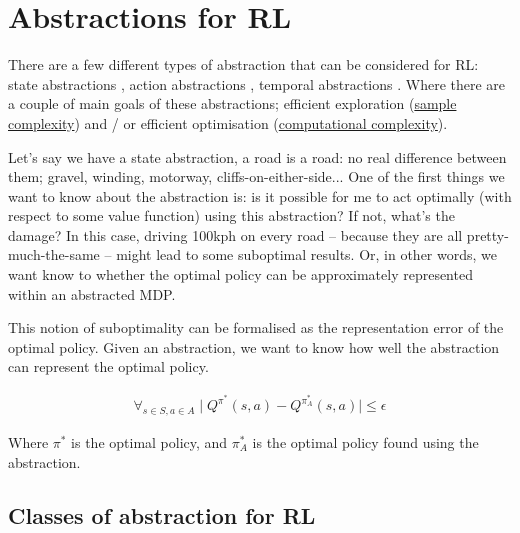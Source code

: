 \section{Abstractions for RL}

There are a few different types of abstraction that can be considered for RL:
state abstractions \cite{Littman2006,Haarnoja,Cuccu2018,Zhonga,Vezzani2019,Abel2018,Duan2018,Abel2017,Silver2016a},
action abstractions \cite{Chandak2019,Bester2019,Tennenholtz2019}, temporal abstractions \cite{Rafati,Mankowitz2018,Harutyunyan2017,Fruit2017,Riemer2018,Bacon2018,Achiam2018,Pham2019,Konidaris2018,Haarnoja,Sutton1999,Fruit2017a,Bacon2016a,Jinnai2018,Nachum2018}.
Where there are a couple of main goals of these abstractions; efficient exploration
(\href{https://en.wikipedia.org/wiki/Sample_complexity}{sample complexity})
and / or efficient optimisation (\href{https://en.wikipedia.org/wiki/Computational_complexity_theory}{computational complexity}).

Let's say we have a state abstraction, a road is a road: no real difference
between them; gravel, winding, motorway, cliffs-on-either-side...
One of the first things we want to know about the abstraction is:
is it possible for me to act optimally (with respect to some value function)
using this abstraction? If not, what's the damage? In this case, driving 100kph on every road --
because they are all pretty-much-the-same -- might lead to some suboptimal results.
Or, in other words, we want know to whether the optimal policy can be approximately represented within an abstracted MDP.

This notion of suboptimality can be formalised as the representation error of the optimal
policy. Given an abstraction, we want to know how well
the abstraction can represent the optimal policy. \cite{Littman2006, Abel2017}

\begin{align}
\forall_{s\in S, a\in A} \mid Q^{\pi^* }(s, a) - Q^{\pi_{A}^* }(s, a) \mid \le \epsilon
\end{align}

Where $\pi^{* }$ is the optimal policy, and $\pi_{A}^{* }$ is the optimal
policy found using the abstraction.

\subsection{Classes of abstraction for RL}

